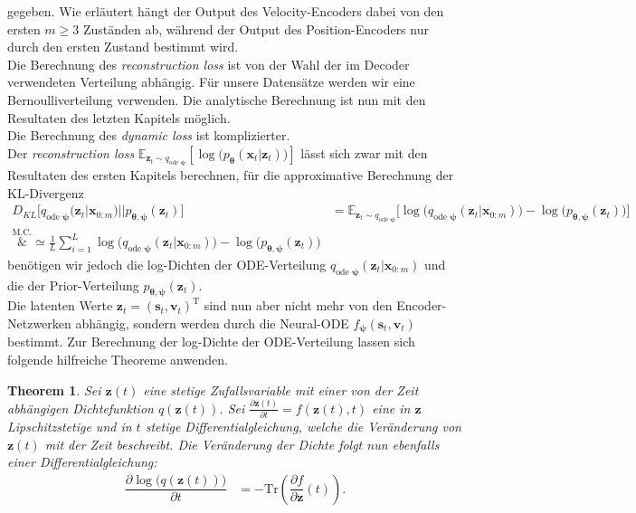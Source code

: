 \documentclass[12pt]{article}
\newcommand{\E}{\mathbb{E}}
\newtheorem{theorem}{Theorem}
\begin{document}
	gegeben. Wie erläutert hängt der Output des Velocity-Encoders dabei von den ersten $m\ge3$ Zuständen ab, während der Output des Position-Encoders nur durch den ersten Zustand bestimmt wird.\\
	Die Berechnung des \emph{reconstruction loss} ist von der Wahl der im Decoder verwendeten Verteilung abhängig. Für unsere Datensätze werden wir eine Bernoulliverteilung verwenden.
	Die analytische Berechnung ist nun mit den Resultaten des letzten Kapitels möglich.\\
	Die Berechnung des \emph{dynamic loss} ist komplizierter. \\
	Der \emph{reconstruction loss} $\E_{\mathbf{z}_{t}\sim q_{\text{ode }\boldsymbol\psi}}
	\left[\log\big(p_{\boldsymbol\theta}\left(\mathbf{x}_{t}|\mathbf{z}_{t}\right)\big)\right] $ lässt sich zwar mit den Resultaten des ersten Kapitels berechnen, für die approximative Berechnung der KL-Divergenz
	\begin{align*}
	D_{KL}\big[q_{\text{ode }\boldsymbol\psi}(\mathbf{z}_{t}|\mathbf{x}_{0:m})||p_{\boldsymbol\theta,\boldsymbol\psi}(\mathbf{z}_{t})\big]
	&=\mathbb{E}_{\mathbf{z}_{t}\sim q_{\text{ode }\boldsymbol\psi}}\big[\log\big(q_{\text{ode }\boldsymbol\psi}(\mathbf{z}_{t}|\mathbf{x}_{0:m}) \big) - \log\big(p_{\boldsymbol\theta,\boldsymbol\psi}(\mathbf{z}_{t}) \big)\big] \\
	\overset{\text{M.C.}}&{\simeq} \frac{1}{L} \sum_{i=1}^{L} \log\big(q_{\text{ode }\boldsymbol\psi}(\mathbf{z}_{t}|\mathbf{x}_{0:m}) \big) - \log\big(p_{\boldsymbol\theta,\boldsymbol\psi}(\mathbf{z}_{t}) \big)
	\end{align*}
	benötigen wir jedoch die log-Dichten der ODE-Verteilung $q_{\text{ode }\boldsymbol\psi}(\mathbf{z}_{t}|\mathbf{x}_{0:m})$ und die der Prior-Verteilung $p_{\boldsymbol\theta,\boldsymbol\psi}(\mathbf{z}_{t})$.\\
	Die latenten Werte $\mathbf{z}_{t} = (\mathbf{s}_{t},\mathbf{v}_{t})^{\mathrm{T}}$ sind nun aber nicht mehr von den Encoder-Netzwerken abhängig, sondern werden durch die Neural-ODE $f_{\boldsymbol\psi}(\mathbf{s}_{t},\mathbf{v}_{t})$ bestimmt.
	Zur Berechnung der log-Dichte der ODE-Verteilung lassen sich folgende hilfreiche Theoreme anwenden.
	\begin{theorem}
		Sei $\mathbf{z}(t)$ eine stetige Zufallsvariable mit einer von der Zeit abhängigen Dichtefunktion $q(\mathbf{z}(t))$. Sei $\tfrac{\partial \mathbf{z}(t)}{\partial t}=f(\mathbf{z}(t),t)$ eine in $\mathbf{z}$ Lipschitzstetige und in $t$ stetige Differentialgleichung, welche die Veränderung von $\mathbf{z}(t)$ mit der Zeit beschreibt.
		Die Veränderung der Dichte folgt nun ebenfalls einer Differentialgleichung:
		\begin{align*}
		\dfrac{\partial \log\big(q(\mathbf{z}(t))\big)}{\partial t}&= - \mathrm{Tr}\left(\dfrac{\partial f}{\partial\mathbf{z}}(t)\right).
		\end{align*}
	\end{theorem}
\end{document}
